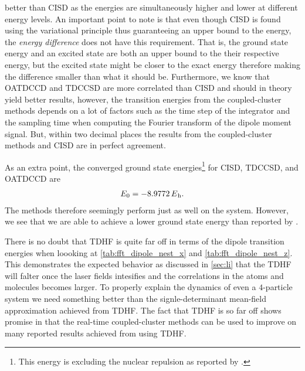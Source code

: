         better than CISD as the energies are simultaneously higher and lower at
        different energy levels.
        An important point to note is that even though CISD is found using the
        variational principle thus guaranteeing an upper bound to the energy,
        the \emph{energy difference} does not have this requirement.
        That is, the ground state energy and an excited state are both an upper
        bound to the their respective energy, but the excited state might be
        closer to the exact energy therefore making the difference smaller than
        what it should be.
        Furthermore, we know that OATDCCD and TDCCSD are more correlated than
        CISD and should in theory yield better results, however, the transition
        energies from the coupled-cluster methods depends on a lot of factors
        such as the time step of the integrator and the sampling time when
        computing the Fourier transform of the dipole moment signal.
        But, within two decimal places the results from the coupled-cluster
        methods and CISD are in perfect agreement.

        As an extra point, the converged ground state energies\footnote{%
            This energy is excluding the nuclear repulsion as reported by
            \citeauthor{nest} \cite{nest}.
        } for CISD, TDCCSD, and OATDCCD are
        \begin{align}
            \energy_0 = \SI{-8.9772}{\hartree}.
        \end{align}
        The methods therefore seemingly perform just as well on the
         system.
        However, we see that we are able to achieve a lower ground state energy
        than reported by \citeauthor{nest} \cite{nest}.

        There is no doubt that TDHF is quite far off in terms of the dipole
        transition energies when loooking at \autoref{tab:fft_dipole_nest_x} and
        \autoref{tab:fft_dipole_nest_z}.
        This demonstrates the expected behavior as discussed in \autoref{sec:li}
        that the TDHF will falter once the laser fields intesifies and the
        correlations in the atoms and molecules becomes larger.
        To properly explain the dynamics of even a $4$-particle system we need
        something better than the signle-determinant mean-field approximation
        achieved from TDHF.
        The fact that TDHF is so far off shows promise in that the real-time
        coupled-cluster methods can be used to improve on many reported results
        achieved from using TDHF.


